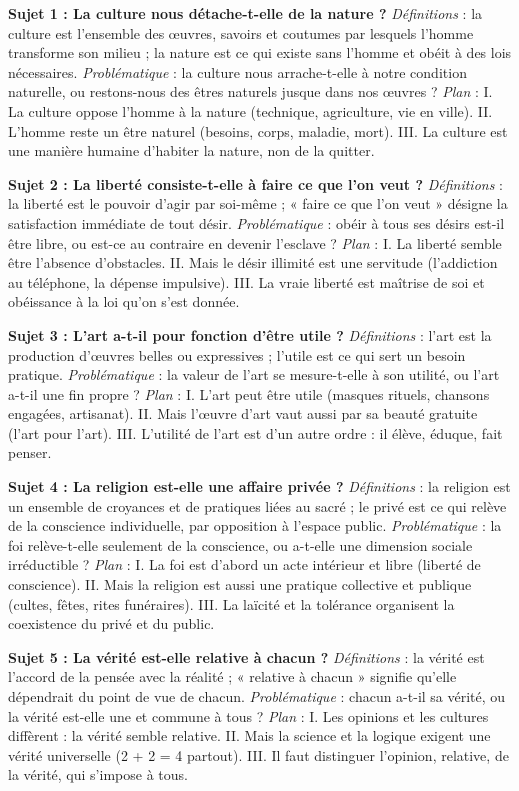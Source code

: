 \documentclass[11pt]{article}
\begin{document}
\begin{corrige}
\textbf{Sujet 1 : La culture nous détache-t-elle de la nature ?}
\emph{Définitions} : la culture est l'ensemble des œuvres, savoirs et coutumes par lesquels l'homme transforme son milieu ; la nature est ce qui existe sans l'homme et obéit à des lois nécessaires. \emph{Problématique} : la culture nous arrache-t-elle à notre condition naturelle, ou restons-nous des êtres naturels jusque dans nos œuvres ? \emph{Plan} : I. La culture oppose l'homme à la nature (technique, agriculture, vie en ville). II. L'homme reste un être naturel (besoins, corps, maladie, mort). III. La culture est une manière humaine d'habiter la nature, non de la quitter.

\textbf{Sujet 2 : La liberté consiste-t-elle à faire ce que l'on veut ?}
\emph{Définitions} : la liberté est le pouvoir d'agir par soi-même ; « faire ce que l'on veut » désigne la satisfaction immédiate de tout désir. \emph{Problématique} : obéir à tous ses désirs est-il être libre, ou est-ce au contraire en devenir l'esclave ? \emph{Plan} : I. La liberté semble être l'absence d'obstacles. II. Mais le désir illimité est une servitude (l'addiction au téléphone, la dépense impulsive). III. La vraie liberté est maîtrise de soi et obéissance à la loi qu'on s'est donnée.

\textbf{Sujet 3 : L'art a-t-il pour fonction d'être utile ?}
\emph{Définitions} : l'art est la production d'œuvres belles ou expressives ; l'utile est ce qui sert un besoin pratique. \emph{Problématique} : la valeur de l'art se mesure-t-elle à son utilité, ou l'art a-t-il une fin propre ? \emph{Plan} : I. L'art peut être utile (masques rituels, chansons engagées, artisanat). II. Mais l'œuvre d'art vaut aussi par sa beauté gratuite (l'art pour l'art). III. L'utilité de l'art est d'un autre ordre : il élève, éduque, fait penser.

\textbf{Sujet 4 : La religion est-elle une affaire privée ?}
\emph{Définitions} : la religion est un ensemble de croyances et de pratiques liées au sacré ; le privé est ce qui relève de la conscience individuelle, par opposition à l'espace public. \emph{Problématique} : la foi relève-t-elle seulement de la conscience, ou a-t-elle une dimension sociale irréductible ? \emph{Plan} : I. La foi est d'abord un acte intérieur et libre (liberté de conscience). II. Mais la religion est aussi une pratique collective et publique (cultes, fêtes, rites funéraires). III. La laïcité et la tolérance organisent la coexistence du privé et du public.

\textbf{Sujet 5 : La vérité est-elle relative à chacun ?}
\emph{Définitions} : la vérité est l'accord de la pensée avec la réalité ; « relative à chacun » signifie qu'elle dépendrait du point de vue de chacun. \emph{Problématique} : chacun a-t-il sa vérité, ou la vérité est-elle une et commune à tous ? \emph{Plan} : I. Les opinions et les cultures diffèrent : la vérité semble relative. II. Mais la science et la logique exigent une vérité universelle (2 + 2 = 4 partout). III. Il faut distinguer l'opinion, relative, de la vérité, qui s'impose à tous.
\end{corrige}
\end{document}

